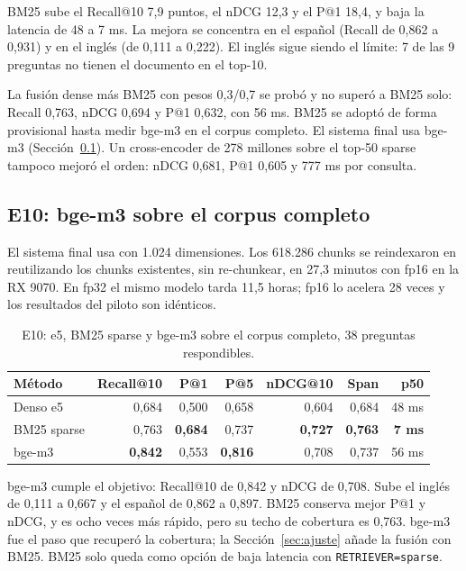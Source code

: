 \documentclass[11pt]{tg_usta}
\begin{document}
BM25 sube el Recall@10 7,9 puntos, el nDCG 12,3 y el P@1 18,4, y baja la latencia de 48 a 7 ms. La mejora se concentra en el español (Recall de 0,862 a 0,931) y en el inglés (de 0,111 a 0,222). El inglés sigue siendo el límite: 7 de las 9 preguntas no tienen el documento en el top-10.

La fusión dense más BM25 con pesos 0,3/0,7 se probó y no superó a BM25 solo: Recall 0,763, nDCG 0,694 y P@1 0,632, con 56 ms. BM25 se adoptó de forma provisional hasta medir bge-m3 en el corpus completo. El sistema final usa bge-m3 (Sección~\ref{sec:bge}). Un cross-encoder de 278 millones sobre el top-50 sparse tampoco mejoró el orden: nDCG 0,681, P@1 0,605 y 777 ms por consulta.

\subsection{E10: bge-m3 sobre el corpus completo}
\label{sec:bge}

El sistema final usa  con 1.024 dimensiones. Los 618.286 chunks se reindexaron en  reutilizando los chunks existentes, sin re-chunkear, en 27,3 minutos con fp16 en la RX 9070. En fp32 el mismo modelo tarda 11,5 horas; fp16 lo acelera 28 veces y los resultados del piloto son idénticos.

\begin{table}[htbp]
\centering
\footnotesize
\begin{tabular}{@{}lrrrrrr@{}}
\toprule
Método & Recall@10 & P@1 & P@5 & nDCG@10 & Span & p50 \\
\midrule
Denso e5 & 0,684 & 0,500 & 0,658 & 0,604 & 0,684 & 48 ms \\
BM25 sparse & 0,763 & \textbf{0,684} & 0,737 & \textbf{0,727} & \textbf{0,763} & \textbf{7 ms} \\
bge-m3 & \textbf{0,842} & 0,553 & \textbf{0,816} & 0,708 & 0,737 & 56 ms \\
\bottomrule
\end{tabular}
\caption{E10: e5, BM25 sparse y bge-m3 sobre el corpus completo, 38 preguntas respondibles.}
\label{tab:e10}
\end{table}

bge-m3 cumple el objetivo: Recall@10 de 0,842 y nDCG de 0,708. Sube el inglés de 0,111 a 0,667 y el español de 0,862 a 0,897. BM25 conserva mejor P@1 y nDCG, y es ocho veces más rápido, pero su techo de cobertura es 0,763. bge-m3 fue el paso que recuperó la cobertura; la Sección~\ref{sec:ajuste} añade la fusión con BM25. BM25 solo queda como opción de baja latencia con \texttt{RETRIEVER=sparse}.
\end{document}
